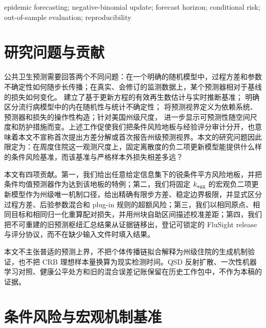 \documentclass[11pt,a4paper]{article}
\begin{document}
\vspace{0.6em}
 epidemic forecasting; negative-binomial update; forecast horizon; conditional risk; out-of-sample evaluation; reproducibility

\vspace{1.0em}
\section{研究问题与贡献}

公共卫生预测需要回答两个不同问题：在一个明确的随机模型中，过程方差和参数不确定性如何随步长传播；在真实、会修订的监测数据上，某个预测器相对于基线的损失如何变化。\citet{cori2013framework,gostic2020practical} 建立了基于更新方程的有效再生数估计与实时推断基准；\citet{penn2023intrinsic} 明确区分流行病模型中的内在随机性与统计不确定性；\citet{petchey2015ecological} 将预测视界定义为依赖系统、预测器和损失的操作性构造；针对美国州级尺度，\citet{bozzuto2023differences} 进一步显示可预测性随空间尺度和防护措施而变。上述工作促使我们把条件风险地板与经验评分审计分开，也意味着本文不宣称首次提出方差分解或首次报告州级预测视界。本文的研究问题因此限定为：在周度住院这一观测尺度上，固定离散度的负二项更新模型能提供什么样的条件风险基准，而该基准与严格样本外损失相差多远？

本文有四项贡献。第一，我们给出任意给定信息集下的锐条件平方风险地板，并把条件均值预测器作为达到该地板的特例；第二，我们将固定 $k_{\rm agg}$ 的宏观负二项更新模型作为州级唯一机制口径，给出精确有限步方差、稳定边界极限，并显式区分过程方差、后验参数混合和 plug-in 规则的超额风险；第三，我们以相同原点、相同目标和相同归一化重算配对损失，并用州块自助区间描述校准差距；第四，我们把不可重建的旧预测枢纽汇总结果从证据链移出，登记可锁定的 FluSight release 与评分协议，而不在缺少输入文件时填入结果。

本文不主张普适的预测上界，不把个体传播链拟合解释为州级住院的生成机制验证，也不把 CRB 理想样本量换算为现实检测时间。QSD 反射扩散、一次性机器学习对照、健康公平处方和旧的混合误差记账保留在历史工作包中，不作为本稿的证据。

\section{条件风险与宏观机制基准}\label{sec:horizon}
\end{document}

